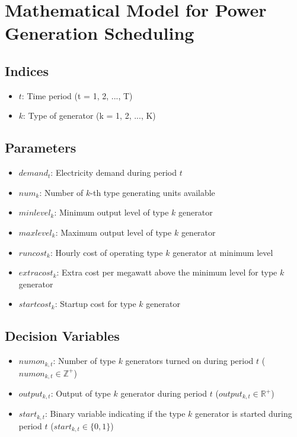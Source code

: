 \documentclass{article}
\begin{document}
\section*{Mathematical Model for Power Generation Scheduling}

\subsection*{Indices}
\begin{itemize}
    \item $t$: Time period (t = 1, 2, ..., T)
    \item $k$: Type of generator (k = 1, 2, ..., K)
\end{itemize}

\subsection*{Parameters}
\begin{itemize}
    \item $demand_t$: Electricity demand during period $t$
    \item $num_k$: Number of $k$-th type generating units available
    \item $minlevel_k$: Minimum output level of type $k$ generator
    \item $maxlevel_k$: Maximum output level of type $k$ generator
    \item $runcost_k$: Hourly cost of operating type $k$ generator at minimum level
    \item $extracost_k$: Extra cost per megawatt above the minimum level for type $k$ generator
    \item $startcost_k$: Startup cost for type $k$ generator
\end{itemize}

\subsection*{Decision Variables}
\begin{itemize}
    \item $numon_{k,t}$: Number of type $k$ generators turned on during period $t$ ($numon_{k,t} \in \mathbb{Z}^+$)
    \item $output_{k,t}$: Output of type $k$ generator during period $t$ ($output_{k,t} \in \mathbb{R}^+$)
    \item $start_{k,t}$: Binary variable indicating if the type $k$ generator is started during period $t$ ($start_{k,t} \in \{0, 1\}$)
\end{itemize}
\end{document}
